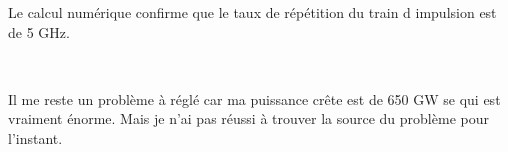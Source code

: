 \documentclass[a4paper,12pt,titlepage]{article}
\begin{document}
        Le calcul numérique confirme que le taux de répétition du train d impulsion est de  5 GHz.
        
        ~
        
        Il me reste un problème à réglé car ma puissance crête est de 650 GW se qui est vraiment énorme. Mais je n'ai pas réussi à trouver la source du problème pour l'instant.
        
\end{document}
